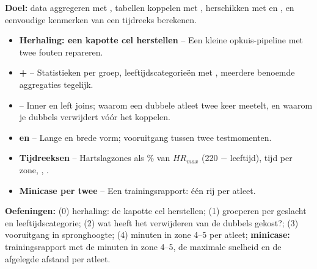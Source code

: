 \textbf{Doel:} data aggregeren met , tabellen koppelen met
, herschikken met  en , en eenvoudige
kenmerken van een tijdreeks berekenen.

\begin{itemize}
  \item \textbf{Herhaling: een kapotte cel herstellen} -- Een kleine opkuis-pipeline met twee fouten repareren.
  \item \textbf{ + } -- Statistieken per groep, leeftijdscategorieën met , meerdere benoemde aggregaties tegelijk.
  \item \textbf{} -- Inner en left joins; waarom een dubbele atleet twee keer meetelt, en waarom je dubbels verwijdert vóór het koppelen.
  \item \textbf{ en } -- Lange en brede vorm; vooruitgang tussen twee testmomenten.
  \item \textbf{Tijdreeksen} -- Hartslagzones als \% van $HR_{max}$ (220 $-$ leeftijd), tijd per zone, , .
  \item \textbf{Minicase per twee} -- Een trainingsrapport: één rij per atleet.
\end{itemize}

\textbf{Oefeningen:} (0) herhaling: de kapotte cel herstellen;
(1) groeperen per geslacht en leeftijdscategorie; (2) wat heeft het
verwijderen van de dubbels gekost?; (3) vooruitgang in spronghoogte;
(4) minuten in zone 4--5 per atleet; \textbf{minicase:}
trainingsrapport met de minuten in zone 4--5, de maximale snelheid en de
afgelegde afstand per atleet.
